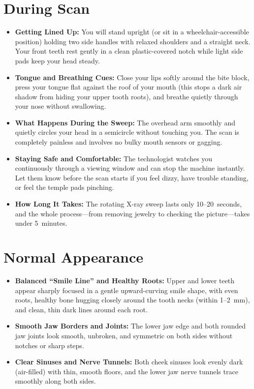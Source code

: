 \section{During Scan}
\begin{itemize}
\item \textbf{Getting Lined Up:} You will stand upright (or sit in a wheelchair-accessible position) holding two side handles with relaxed shoulders and a straight neck. Your front teeth rest gently in a clean plastic-covered notch while light side pads keep your head steady.
\item \textbf{Tongue and Breathing Cues:} Close your lips softly around the bite block, press your tongue flat against the roof of your mouth (this stops a dark air shadow from hiding your upper tooth roots), and breathe quietly through your nose without swallowing.
\item \textbf{What Happens During the Sweep:} The overhead arm smoothly and quietly circles your head in a semicircle without touching you. The scan is completely painless and involves no bulky mouth sensors or gagging.
\item \textbf{Staying Safe and Comfortable:} The technologist watches you continuously through a viewing window and can stop the machine instantly. Let them know before the scan starts if you feel dizzy, have trouble standing, or feel the temple pads pinching.
\item \textbf{How Long It Takes:} The rotating X-ray sweep lasts only 10--20~seconds, and the whole process---from removing jewelry to checking the picture---takes under 5~minutes.
\end{itemize}

\section{Normal Appearance}
\begin{itemize}
\item \textbf{Balanced ``Smile Line'' and Healthy Roots:} Upper and lower teeth appear sharply focused in a gentle upward-curving smile shape, with even roots, healthy bone hugging closely around the tooth necks (within 1--2~mm), and clean, thin dark lines around each root.
\item \textbf{Smooth Jaw Borders and Joints:} The lower jaw edge and both rounded jaw joints look smooth, unbroken, and symmetric on both sides without notches or sharp steps.
\item \textbf{Clear Sinuses and Nerve Tunnels:} Both cheek sinuses look evenly dark (air-filled) with thin, smooth floors, and the lower jaw nerve tunnels trace smoothly along both sides.
\end{itemize}

